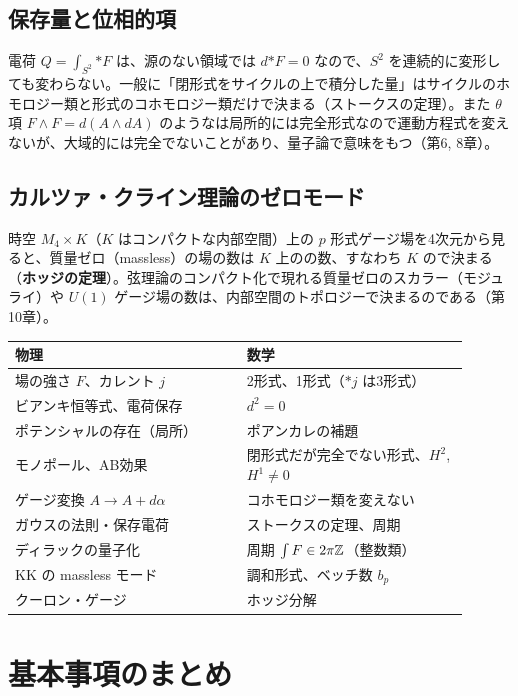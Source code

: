 \subsection*{保存量と位相的項}
電荷 $Q=\int_{S^2}{*F}$ は、源のない領域では $d{*F}=0$ なので、$S^2$ を連続的に変形しても変わらない。一般に「閉形式をサイクルの上で積分した量」はサイクルのホモロジー類と形式のコホモロジー類だけで決まる（ストークスの定理）。また $\theta$ 項 $F\wedge F=d(A\wedge dA)$ のようなは局所的には完全形式なので運動方程式を変えないが、大域的には完全でないことがあり、量子論で意味をもつ（第6, 8章）。

\subsection*{カルツァ・クライン理論のゼロモード}
時空 $M_4\times K$（$K$ はコンパクトな内部空間）上の $p$ 形式ゲージ場を4次元から見ると、質量ゼロ（massless）の場の数は $K$ 上のの数、すなわち $K$ ので決まる（\textbf{ホッジの定理}）。弦理論のコンパクト化で現れる質量ゼロのスカラー（モジュライ）や $U(1)$ ゲージ場の数は、内部空間のトポロジーで決まるのである（第10章）。

\begin{physbox}[：本章の辞書]
\begin{center}
\small
\begin{tabular}{p{0.46\linewidth}p{0.44\linewidth}}
物理 & 数学\\ \hline
場の強さ $F$、カレント $j$ & 2形式、1形式（${*j}$ は3形式）\\
ビアンキ恒等式、電荷保存 & $d^2=0$\\
ポテンシャルの存在（局所） & ポアンカレの補題\\
モノポール、AB効果 & 閉形式だが完全でない形式、$H^2$, $H^1\neq0$\\
ゲージ変換 $A\to A+d\alpha$ & コホモロジー類を変えない\\
ガウスの法則・保存電荷 & ストークスの定理、周期\\
ディラックの量子化 & 周期 $\int F\in2\pi\mathbb{Z}$（整数類）\\
KK の massless モード & 調和形式、ベッチ数 $b_p$\\
クーロン・ゲージ & ホッジ分解
\end{tabular}
\end{center}
\end{physbox}

\section{基本事項のまとめ}

